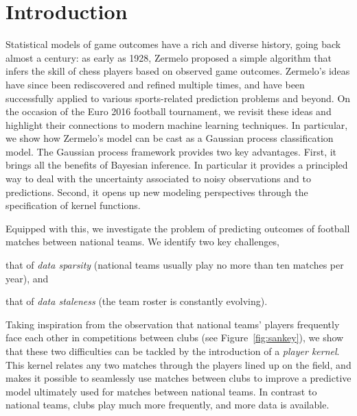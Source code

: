 \section{Introduction}
\label{sec:intro}


Statistical models of game outcomes have a rich and diverse history, going back almost a century:
as early as 1928, Zermelo \cite{zermelo1928berechnung} proposed a simple algorithm that infers the skill of chess players based on observed game outcomes.
Zermelo's ideas have since been rediscovered and refined multiple times, and have been successfully applied to various sports-related prediction problems and beyond.
On the occasion of the Euro 2016 football tournament, we revisit these ideas and highlight their connections to modern machine learning techniques.
In particular, we show how Zermelo's model can be cast as a Gaussian process classification model.
The Gaussian process framework provides two key advantages.
First, it brings all the benefits of Bayesian inference. In particular it provides a principled way to deal with the uncertainty associated to noisy observations and to predictions.
Second, it opens up new modeling perspectives through the specification of kernel functions.

Equipped with this, we investigate the problem of predicting outcomes of football matches between national teams.
We identify two key challenges,
\begin{enuminline}
\item that of \emph{data sparsity} (national teams usually play no more than ten matches per year), and
\item that of \emph{data staleness} (the team roster is constantly evolving).
\end{enuminline}
Taking inspiration from the observation that national teams' players frequently face each other in competitions between clubs (see Figure~\ref{fig:sankey}), we show that these two difficulties can be tackled by the introduction of a \emph{player kernel}.
This kernel relates any two matches through the players lined up on the field, and makes it possible to seamlessly use matches between clubs to improve a predictive model ultimately used for matches between national teams.
In contrast to national teams, clubs play much more frequently, and more data is available.

